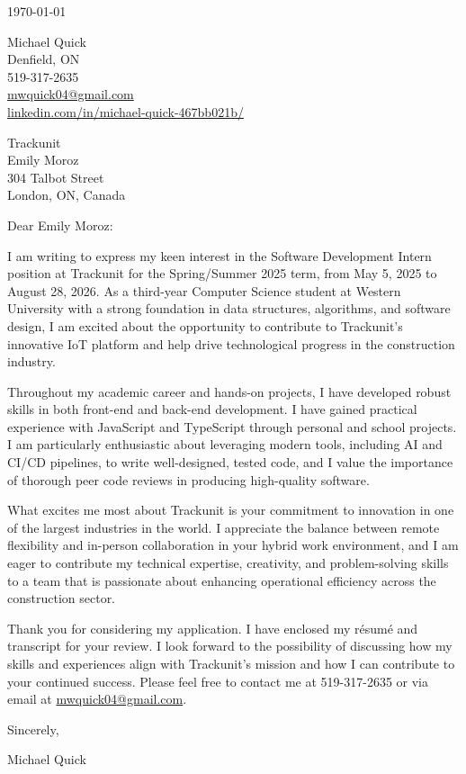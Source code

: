 \documentclass[11pt]{article}
\begin{document}
\begin{flushright}
\today
\end{flushright}

\noindent Michael Quick \\
Denfield, ON \\
519-317-2635 \\
\href{mailto:mwquick04@gmail.com}{mwquick04@gmail.com} \\
\href{https://www.linkedin.com/in/michael-quick-467bb021b/}{linkedin.com/in/michael-quick-467bb021b/}

\vspace{1em}

\noindent Trackunit \\
Emily Moroz \\
304 Talbot Street \\
London, ON, Canada

\vspace{1em}

\noindent Dear Emily Moroz:

\setlength{\parindent}{15pt}
\setlength{\parskip}{0.75em}

I am writing to express my keen interest in the Software Development Intern position at Trackunit for the Spring/Summer 2025 term, from May 5, 2025 to August 28, 2026. As a third-year Computer Science student at Western University with a strong foundation in data structures, algorithms, and software design, I am excited about the opportunity to contribute to Trackunit’s innovative IoT platform and help drive technological progress in the construction industry.

Throughout my academic career and hands-on projects, I have developed robust skills in both front-end and back-end development. I have gained practical experience with JavaScript and TypeScript through personal and school projects. I am particularly enthusiastic about leveraging modern tools, including AI and CI/CD pipelines, to write well-designed, tested code, and I value the importance of thorough peer code reviews in producing high-quality software.

What excites me most about Trackunit is your commitment to innovation in one of the largest industries in the world. I appreciate the balance between remote flexibility and in-person collaboration in your hybrid work environment, and I am eager to contribute my technical expertise, creativity, and problem-solving skills to a team that is passionate about enhancing operational efficiency across the construction sector.

Thank you for considering my application. I have enclosed my résumé and transcript for your review. I look forward to the possibility of discussing how my skills and experiences align with Trackunit’s mission and how I can contribute to your continued success. Please feel free to contact me at 519-317-2635 or via email at \href{mailto:mwquick04@gmail.com}{mwquick04@gmail.com}.

\setlength{\parindent}{0pt}

\vspace{1em}
Sincerely,

\vspace{1em}
Michael Quick
\end{document}
